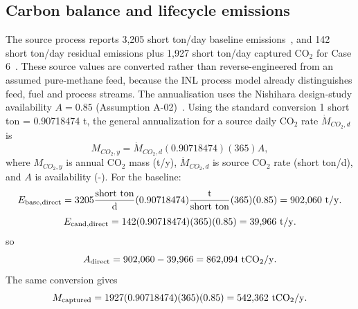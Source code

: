 

\subsection{Carbon balance and lifecycle emissions}
The source process reports 3,205 short ton/day baseline emissions~\cite{inltev953}, and 142 short ton/day residual emissions plus 1,927 short ton/day captured CO$_2$ for Case 6~\cite{inltev961}. These source values are converted rather than reverse-engineered from an assumed pure-methane feed, because the INL process model already distinguishes feed, fuel and process streams. The annualisation uses the Nishihara design-study availability $A=0.85$ (Assumption A-02)~\cite{nishihara2007potential}. Using the standard conversion 1 short ton = 0.90718474 t, the general annualization for a source daily CO$_2$ rate $\dot M_{CO_2,d}$ is
\begin{equation}\label{eq:co2-annual-general}
M_{CO_2,y}=\dot M_{CO_2,d}(0.90718474)(365)A,
\end{equation}
where $M_{CO_2,y}$ is annual CO$_2$ mass (t/y), $\dot M_{CO_2,d}$ is source CO$_2$ rate (short ton/d), and $A$ is availability (-). For the baseline:
\begin{equation}\label{eq:base-direct}
E_{\rm base,direct}=3205\frac{\mathrm{short\ ton}}{\mathrm d}
(0.90718474)\frac{\mathrm t}{\mathrm{short\ ton}}(365)(0.85)
=902{,}060~\mathrm{t/y}.
\end{equation}
\begin{equation}\label{eq:cand-direct}
E_{\rm cand,direct}=142(0.90718474)(365)(0.85)
=39{,}966~\mathrm{t/y}.
\end{equation}
so
\begin{equation}\label{eq:direct-avoided}
A_{\rm direct}=902{,}060-39{,}966=862{,}094~\mathrm{tCO_2/y}.
\end{equation}
The same conversion gives
\begin{equation}\label{eq:captured-annual}
M_{\rm captured}=1927(0.90718474)(365)(0.85)
=542{,}362~\mathrm{tCO_2/y}.
\end{equation}


